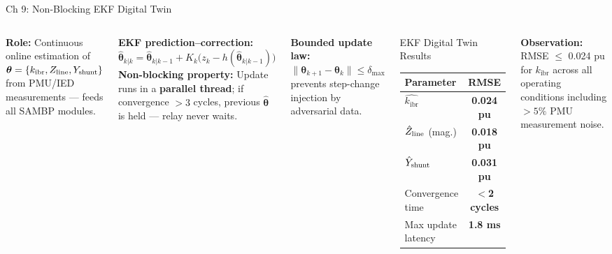 \documentclass[10pt,aspectratio=169]{beamer}
\newcommand{\obs}[1]{%
  {\color{iitmred}\textbf{Observation:} #1}%
}
\newcommand{\kibr}{k_{\mathrm{ibr}}}
\begin{document}
\begin{frame}{Ch 9: Non-Blocking EKF Digital Twin}
  \begin{columns}[T]
      \textbf{Role:} Continuous online estimation of
      $\boldsymbol{\theta} = \{\kibr, Z_{\rm line}, Y_{\rm shunt}\}$
      from PMU/IED measurements — feeds all SAMBP modules.

      \medskip
      \textbf{EKF prediction–correction:}
      \[
        \hat{\boldsymbol{\theta}}_{k|k}
          = \hat{\boldsymbol{\theta}}_{k|k-1}
            + K_k \bigl(z_k - h(\hat{\boldsymbol{\theta}}_{k|k-1})\bigr)
      \]
      \textbf{Non-blocking property:}
      Update runs in a \textbf{parallel thread};
      if convergence $>\!3$ cycles, previous
      $\hat{\boldsymbol{\theta}}$ is held — relay never waits.

      \medskip
      \textbf{Bounded update law:}
      $\|\boldsymbol{\theta}_{k+1} - \boldsymbol{\theta}_k\|
        \leq \delta_{\max}$
      prevents step-change injection by adversarial data.
      \begin{block}{\small EKF Digital Twin Results}
        \small
        \begin{tabular}{lc}
          \toprule
          Parameter & RMSE\\
          \midrule
          $\hat{\kibr}$ & \textbf{0.024 pu}\\
          $\hat{Z}_{\rm line}$ (mag.) & \textbf{0.018 pu}\\
          $\hat{Y}_{\rm shunt}$ & \textbf{0.031 pu}\\
          Convergence time & \textbf{$<$2 cycles}\\
          Max update latency & \textbf{1.8 ms}\\
          \bottomrule
        \end{tabular}
      \end{block}
      \vspace{0.2cm}
      \obs{RMSE $\leq$ 0.024 pu for $\kibr$ across
        all operating conditions including
        $>\!5\%$ PMU measurement noise.}
  \end{columns}
\end{frame}
\end{document}
